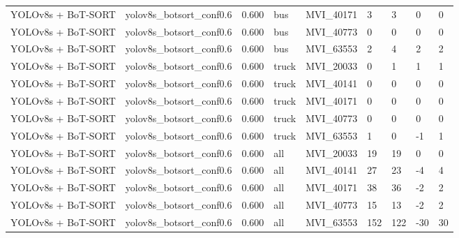 \begin{tabular}{lllllllll}
YOLOv8s + BoT-SORT & yolov8s\_botsort\_conf0.6 & 0.600 & bus & MVI\_40171 & 3 & 3 & 0 & 0 \\
YOLOv8s + BoT-SORT & yolov8s\_botsort\_conf0.6 & 0.600 & bus & MVI\_40773 & 0 & 0 & 0 & 0 \\
YOLOv8s + BoT-SORT & yolov8s\_botsort\_conf0.6 & 0.600 & bus & MVI\_63553 & 2 & 4 & 2 & 2 \\
YOLOv8s + BoT-SORT & yolov8s\_botsort\_conf0.6 & 0.600 & truck & MVI\_20033 & 0 & 1 & 1 & 1 \\
YOLOv8s + BoT-SORT & yolov8s\_botsort\_conf0.6 & 0.600 & truck & MVI\_40141 & 0 & 0 & 0 & 0 \\
YOLOv8s + BoT-SORT & yolov8s\_botsort\_conf0.6 & 0.600 & truck & MVI\_40171 & 0 & 0 & 0 & 0 \\
YOLOv8s + BoT-SORT & yolov8s\_botsort\_conf0.6 & 0.600 & truck & MVI\_40773 & 0 & 0 & 0 & 0 \\
YOLOv8s + BoT-SORT & yolov8s\_botsort\_conf0.6 & 0.600 & truck & MVI\_63553 & 1 & 0 & -1 & 1 \\
YOLOv8s + BoT-SORT & yolov8s\_botsort\_conf0.6 & 0.600 & all & MVI\_20033 & 19 & 19 & 0 & 0 \\
YOLOv8s + BoT-SORT & yolov8s\_botsort\_conf0.6 & 0.600 & all & MVI\_40141 & 27 & 23 & -4 & 4 \\
YOLOv8s + BoT-SORT & yolov8s\_botsort\_conf0.6 & 0.600 & all & MVI\_40171 & 38 & 36 & -2 & 2 \\
YOLOv8s + BoT-SORT & yolov8s\_botsort\_conf0.6 & 0.600 & all & MVI\_40773 & 15 & 13 & -2 & 2 \\
YOLOv8s + BoT-SORT & yolov8s\_botsort\_conf0.6 & 0.600 & all & MVI\_63553 & 152 & 122 & -30 & 30 \\
\bottomrule
\end{tabular}

